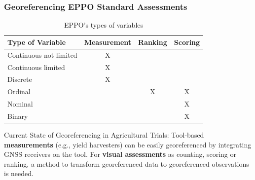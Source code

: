 \documentclass[aspectratio=43]{beamer}
\begin{document}
\begin{frame}
    \frametitle{\small Georeferencing EPPO Standard Assessments}
    
    \begin{table}[ht]
        \caption{\small EPPO's types of variables}
        \label{tab:data_types_slide}
        \centering
        \begin{tabular}{|l|c|c|c|}
        \hline
        \textbf{Type of Variable} & \textbf{Measurement} & \textbf{Ranking} & \textbf{Scoring} \\
        \hline
        \rowcolor{green!20} Continuous not limited & X & & \\
        \hline
        \rowcolor{green!20} Continuous limited & X & & \\
        \hline
        \rowcolor{yellow!20} Discrete & X & & \\
        \hline
        \rowcolor{red!20} Ordinal & & X & X \\
        \hline
        \rowcolor{red!20} Nominal & & & X \\
        \hline
        \rowcolor{red!20} Binary & & & X \\
        \hline
        \end{tabular}
        \end{table}
        
    \begin{flushleft}
        \hspace{1.5cm}{\tiny Summary from EPPO PP 1/152: Design and analysis of efficacy evaluation trials}
    \end{flushleft}

    \begin{block}{Current State of Georeferencing in Agricultural Trials:}
        \small Tool-based \textbf{measurements} (e.g., yield harvesters) can be easily georeferenced by integrating GNSS receivers on the tool. For \textbf{visual assessments} as counting, scoring or ranking, a method to transform georeferenced data to georeferenced observations is needed.
    \end{block}
\end{frame}
\end{document}
